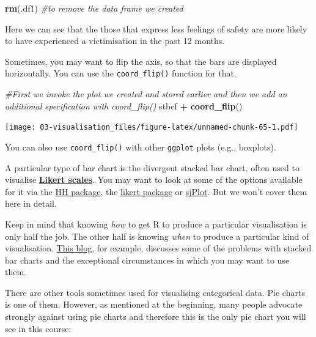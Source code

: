 \documentclass[]{book}
\newenvironment{Shaded}{\begin{snugshade}}{\end{snugshade}}
\newcommand{\CommentTok}[1]{\textcolor[rgb]{0.56,0.35,0.01}{\textit{#1}}}
\newcommand{\KeywordTok}[1]{\textcolor[rgb]{0.13,0.29,0.53}{\textbf{#1}}}
\newcommand{\NormalTok}[1]{#1}
\newcommand{\OperatorTok}[1]{\textcolor[rgb]{0.81,0.36,0.00}{\textbf{#1}}}
\newcommand{\StringTok}[1]{\textcolor[rgb]{0.31,0.60,0.02}{#1}}
\theoremstyle{definition}
\theoremstyle{definition}
\theoremstyle{definition}
\theoremstyle{remark}
\begin{document}
\begin{Shaded}
\begin{Highlighting}[]
\KeywordTok{rm}\NormalTok{(.df1) }\CommentTok{#to remove the data frame we created}
\end{Highlighting}
\end{Shaded}

Here we can see that the those that express less feelings of safety are
more likely to have experienced a victimisation in the past 12 months.

Sometimes, you may want to flip the axis, so that the bars are displayed
horizontally. You can use the \texttt{coord\_flip()} function for that.

\begin{Shaded}
\begin{Highlighting}[]
\CommentTok{#First we invoke the plot we created and stored earlier and then we add an additional specification with coord_flip()}
\NormalTok{stbcf }\OperatorTok{+}\StringTok{ }\KeywordTok{coord_flip}\NormalTok{()}
\end{Highlighting}
\end{Shaded}

\texttt{[image: 03-visualisation\_files/figure-latex/unnamed-chunk-65-1.pdf]}

You can also use \texttt{coord\_flip()} with other \texttt{ggplot} plots
(e.g., boxplots).

A particular type of bar chart is the divergent stacked bar chart, often
used to visualise
\href{http://en.wikipedia.org/wiki/Likert_scale}{\textbf{Likert
scales}}. You may want to look at some of the options available for it
via the \href{http://www.jstatsoft.org/v57/i05/paper}{HH package}, the
\href{http://jason.bryer.org/likert/}{likert package} or
\href{http://strengejacke.wordpress.com/2013/07/17/plotting-likert-scales-net-stacked-distributions-with-ggplot-rstats/}{sjPlot}.
But we won't cover them here in detail.

Keep in mind that knowing \emph{how} to get R to produce a particular
visualisation is only half the job. The other half is knowing
\emph{when} to produce a particular kind of visualisation.
\href{https://solomonmessing.wordpress.com/2014/10/11/when-to-use-stacked-barcharts/}{This
blog}, for example, discusses some of the problems with stacked bar
charts and the exceptional circumstances in which you may want to use
them.

There are other tools sometimes used for visualising categorical data.
Pie charts is one of them. However, as mentioned at the beginning, many
people advocate strongly against using pie charts and therefore this is
the only pie chart you will see in this course:
\end{document}
